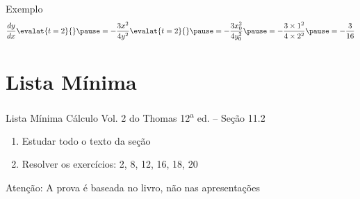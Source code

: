\begin{frame}{Exemplo \theexemplo}
\[
	\frac{dy}{dx} \evalat{t=2}{}
	\pause
	= -\frac{3x^2}{4y^2}\evalat{t=2}{}
	\pause
	= -\frac{3x_0^2}{4y_0^2}
	\pause
	= -\frac{3\times 1^2}{4\times 2^2}
	\pause
	= -\frac{3}{16}
\]
\end{frame}

\section{Lista Mínima}

\begin{frame}{Lista Mínima}
  Cálculo Vol. 2 do Thomas 12\textsuperscript{a} ed. -- Seção 11.2
  \begin{enumerate}
    \item Estudar todo o texto da seção
    \item Resolver os exercícios: 2, 8, 12, 16, 18, 20
  \end{enumerate}

  \vfill
  Atenção: A prova é baseada no livro, não nas apresentações
\end{frame}



